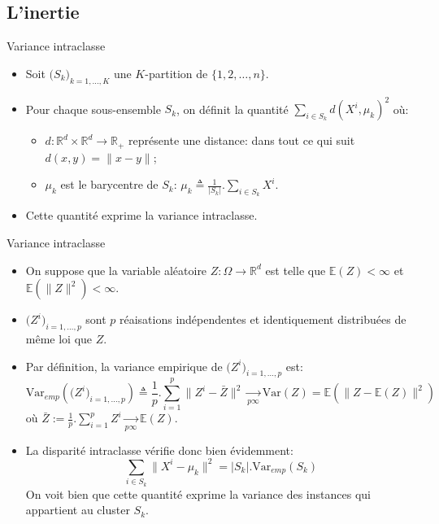 \documentclass[8pt]{beamer}
\begin{document}
		\subsection{L'inertie}
			\begin{frame}{Variance intraclasse}
				\begin{itemize}
					\item<1-> Soit \(\big(S_k\big)_{k = 1, \dots, K}\) une \(K\)-partition de \(\{1, 2, \dots, n\}\).
					\item<2-> Pour chaque sous-ensemble \(S_k\), on définit la quantité \(\sum_{i\in S_k} d(X^i, \mu_k)^2\) où:
						\begin{itemize}
							\item<3-> \(d: \mathbb{R}^d \times \mathbb{R}^d \rightarrow \mathbb{R}_+\) représente une distance: dans tout ce qui suit \(d(x, y) = \lVert x - y \rVert\);
							\item<3-> \(\mu_k\) est le barycentre de \(S_k\): \( \mu_k \triangleq \frac{1}{\vert S_k \vert}.\sum_{i\in S_k} X^i\).
						\end{itemize}
					\item<4-> Cette quantité exprime la variance intraclasse.
				\end{itemize}
			\end{frame}
			\begin{frame}{Variance intraclasse}
				\begin{itemize}
					\item<1-> On suppose que la variable aléatoire \(Z: \Omega \rightarrow \mathbb{R}^d\) est telle que \(\mathbb{E}(Z) < \infty\) et \(\mathbb{E}(\lVert Z \rVert^2) < \infty\).
					\item<2-> \(\big(Z^i\big)_{i=1,\dots,p}\) sont \(p\) réaisations indépendentes et identiquement distribuées de même loi que \(Z\).
					\item<3-> Par définition, la variance empirique de \(\big(Z^i\big)_{i=1,\dots,p}\) est:
						\begin{equation}
							\text{Var}_{emp}(\big(Z^i\big)_{i=1,\dots,p}) \triangleq \frac{1}{p} . \sum_{i=1}^{p} \lVert Z^i - \bar Z \rVert^2 \underset{p\infty}{\longrightarrow} \text{Var}(Z) = \mathbb{E}(\lVert Z - \mathbb{E}(Z) \rVert^2)
						\end{equation}
						où \(\bar Z := \frac{1}{p}.\sum_{i=1}^{p} Z^i \underset{p\infty}{\longrightarrow} \mathbb{E}(Z)\).
					\item<4-> La disparité intraclasse vérifie donc bien évidemment:
						\begin{equation}
							\sum_{i\in S_k} \lVert X^i - \mu_k \rVert^2 = \vert S_k \vert . \text{Var}_{emp}(S_k)
						\end{equation}
						On voit bien que cette quantité exprime la variance des instances qui appartient au cluster \(S_k\).
				\end{itemize}
			\end{frame}
\end{document}
